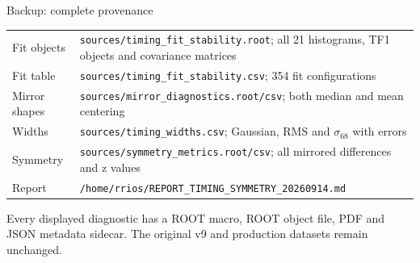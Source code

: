 \begin{frame}{Backup: complete provenance}
\small
\begin{tabularx}{\linewidth}{@{}lX@{}}
\toprule
Fit objects & \texttt{sources/timing\_fit\_stability.root}; all 21 histograms, TF1 objects and covariance matrices\\
Fit table & \texttt{sources/timing\_fit\_stability.csv}; 354 fit configurations\\
Mirror shapes & \texttt{sources/mirror\_diagnostics.root/csv}; both median and mean centering\\
Widths & \texttt{sources/timing\_widths.csv}; Gaussian, RMS and $\sigma_{68}$ with errors\\
Symmetry & \texttt{sources/symmetry\_metrics.root/csv}; all mirrored differences and z values\\
Report & \texttt{/home/rrios/REPORT\_TIMING\_SYMMETRY\_20260914.md}\\
\bottomrule
\end{tabularx}
\vspace{6pt}
Every displayed diagnostic has a ROOT macro, ROOT object file, PDF and JSON metadata sidecar. The original v9 and production datasets remain unchanged.
\end{frame}
